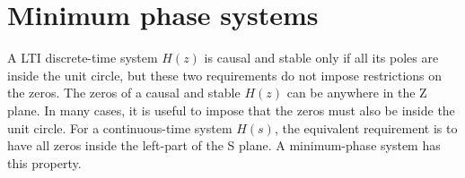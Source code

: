 


%


\section{{\akadvanced} Minimum phase systems}
\label{app:minimumPhase}
 A LTI discrete-time system $H(z)$ is causal and stable only if all its poles are inside the unit circle, but these two requirements do not impose restrictions on the zeros. The zeros of a causal and stable $H(z)$ can be anywhere in the Z plane. In many cases, it is useful to impose that the zeros must also be inside the unit circle. For a continuous-time system $H(s)$, the equivalent requirement is to have all zeros inside the left-part of the S plane. A minimum-phase system has this property.

